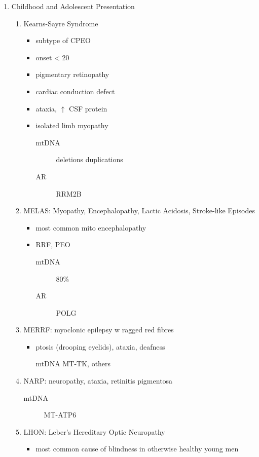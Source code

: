\documentclass{scrartcl}
\begin{document}
\begin{enumerate}
\item Childhood and Adolescent Presentation
\label{sec:org1bccae2}
\begin{enumerate}
\item Kearns-Sayre Syndrome
\label{sec:org0b31f97}
\begin{itemize}
\item subtype of CPEO
\item onset \textless{} 20
\item pigmentary retinopathy
\item cardiac conduction defect
\item ataxia, \(\uparrow\) CSF protein
\item isolated limb myopathy
\begin{description}
\item[{mtDNA}] deletions \textpm{} duplications
\item[{AR}] RRM2B
\end{description}
\end{itemize}
\item MELAS: Myopathy, Encephalopathy, Lactic Acidosis, Stroke-like Episodes
\label{sec:org83487f1}
\begin{itemize}
\item most common mito encephalopathy
\item RRF, PEO
\begin{description}
\item[{mtDNA}] 80\%
\item[{AR}] POLG
\end{description}
\end{itemize}
\item MERRF: myoclonic epilepsy w ragged red fibres
\label{sec:org09e4532}
\begin{itemize}
\item ptosis (drooping eyelids), ataxia, deafness
\item[{mtDNA}] MT-TK, others
\end{itemize}
\item NARP: neuropathy, ataxia, retinitis pigmentosa
\label{sec:orgd1b04ee}
\begin{description}
\item[{mtDNA}] MT-ATP6
\end{description}
\item LHON: Leber’s Hereditary Optic Neuropathy
\label{sec:orgb7fad21}
\begin{itemize}
\item most common cause of blindness in otherwise healthy young men

\end{itemize}
\end{enumerate}
\end{enumerate}
\end{document}
